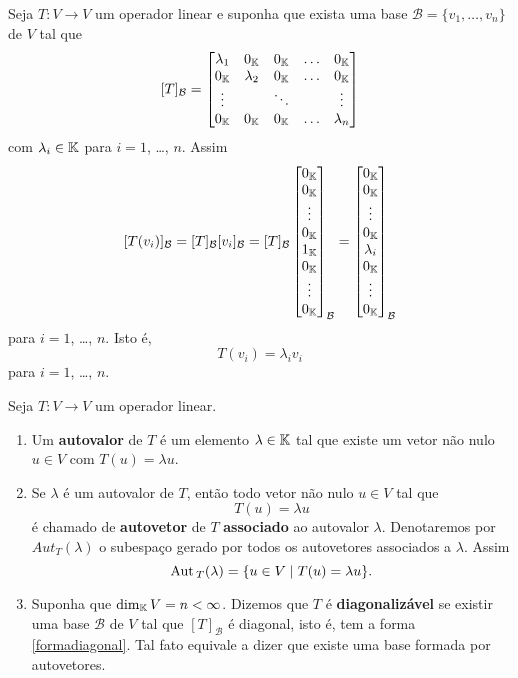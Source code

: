 Seja $T : V \to V$ um operador linear e suponha que exista uma base $\mathcal{B} = \{v_1,\dots,v_n\}$ de $V$ tal que
\begin{align}\label{formadiagonal}
	[T]_\mathcal{B} = \begin{bmatrix}
		\lambda_1 & 0_{\mathbb{K}} & 0_{\mathbb{K}} & \dots & 0_{\mathbb{K}}\\
		0_{\mathbb{K}} & \lambda_2 & 0_{\mathbb{K}} & \dots & 0_{\mathbb{K}}\\
		\vdots & & \ddots & & \vdots\\
		0_{\mathbb{K}} & 0_{\mathbb{K}} & 0_{\mathbb{K}} & \dots & \lambda_n
	\end{bmatrix}
\end{align}
com $\lambda_i \in \mathbb{K}$ para $i = 1$, \dots, $n$. Assim
\[
	[T(v_i)]_\mathcal{B} = [T]_\mathcal{B}[v_i]_\mathcal{B} = [T]_\mathcal{B}\begin{bmatrix}
		0_{\mathbb{K}}\\
		0_{\mathbb{K}}\\
		\vdots\\
		0_{\mathbb{K}}\\
		1_{\mathbb{K}}\\
		0_{\mathbb{K}}\\
		\vdots\\
		0_{\mathbb{K}}
	\end{bmatrix}_\mathcal{B} = \begin{bmatrix}
		0_{\mathbb{K}}\\
		0_{\mathbb{K}}\\
		\vdots\\
		0_{\mathbb{K}}\\
		\lambda_i\\
		0_{\mathbb{K}}\\
		\vdots\\
		0_{\mathbb{K}}
	\end{bmatrix}_\mathcal{B}
\]
para $i = 1$, \dots, $n$. Isto \'e,
\[
	T(v_i) = \lambda_i v_i
\]
para $i = 1$, \dots, $n$.

\begin{definicao}
	Seja $T : V \to V$ um operador linear.
	\begin{enumerate}[label={\roman*})]
		\item Um \textbf{autovalor} de $T$ \'e um elemento $\lambda \in \mathbb{K}$ tal que existe um vetor n\~ao nulo $u \in V$ com $T(u) = \lambda u$.
		\item Se $\lambda$ \'e um autovalor de $T$, ent\~ao todo vetor n\~ao nulo $u \in V$ tal que
		\[
			T(u) = \lambda u
		\]
		\'e chamado de \textbf{autovetor} de $T$ \textbf{associado} ao autovalor $\lambda$. Denotaremos por $Aut_T(\lambda)$ o subespa\c{c}o gerado por todos os autovetores associados a $\lambda$. Assim
		\[
			{\rm Aut\,}_T(\lambda) = \{u \in V \mid T(u) = \lambda u\}.
		\]
		\item Suponha que $\dim_{\mathbb{K}} V = n < \infty$. Dizemos que $T$ \'e \textbf{diagonaliz\'avel} se existir uma base $\mathcal{B}$ de $V$ tal que $[T]_\mathcal{B}$ \'e diagonal, isto \'e, tem a forma \eqref{formadiagonal}. Tal fato equivale a dizer que existe uma base formada por autovetores.
	\end{enumerate}
\end{definicao}

